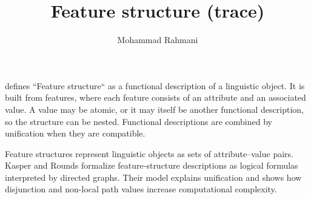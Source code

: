 \documentclass[a4paper]{article}
\title{Feature structure (trace)}
\date{}
\author{Mohammad Rahmani}
\begin{document}
    \maketitle
    \cite{kay-1984-functional-unification-grammar} defines ``Feature structure`` as a functional description of a linguistic object. It is built from features, where each feature consists of an attribute and an associated value. A value may be atomic, or it may itself be another functional description, so the structure can be nested. Functional descriptions are combined by unification when they are compatible.
    
    Feature structures \cite{kasper-1986-a-logical-semantics-for-feature-structures} represent linguistic objects as sets of attribute--value pairs. Kasper and Rounds formalize feature-structure descriptions as logical formulas interpreted by directed graphs.
    Their model explains unification and shows how disjunction and non-local path values increase computational complexity.
    
    
    
\end{document}
